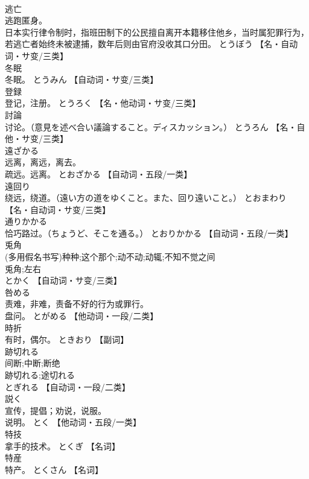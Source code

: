 \documentclass[8pt]{extreport}
\begin{document}
\begin{CJK}{UTF8}{min}
\\	逃亡	
\\	逃跑匿身。 
\\	日本实行律令制时，指班田制下的公民擅自离开本籍移住他乡，当时属犯罪行为，若逃亡者始终未被逮捕，数年后则由官府没收其口分田。	とうぼう		【名・自动词・サ变/三类】
\\	冬眠	
\\	冬眠。	とうみん		【自动词・サ变/三类】
\\	登録	
\\	登记，注册。	とうろく		【名・他动词・サ变/三类】
\\	討論	
\\	讨论。（意見を述べ合い議論すること。ディスカッション。）	とうろん		【名・自他・サ变/三类】
\\	遠ざかる	
\\	远离，离远，离去。 
\\	疏远。远离。	とおざかる		【自动词・五段/一类】
\\	遠回り	
\\	绕远，绕道。（遠い方の道をゆくこと。また、回り遠いこと。）	とおまわり		【名・自动词・サ变/三类】
\\	通りかかる	
\\	恰巧路过。（ちょうど、そこを通る。）	とおりかかる		【自动词・五段/一类】
\\	兎角	
\\	(多用假名书写)种种;这个那个;动不动;动辄;不知不觉之间 
\\	兎角;左右 
\\	とかく		【自动词・サ变/三类】
\\	咎める	
\\	责难，非难，责备不好的行为或罪行。 
\\	盘问。	とがめる		【他动词・一段/二类】
\\	時折	
\\	有时，偶尔。	ときおり		【副词】
\\	跡切れる	
\\	间断;中断;断绝 
\\	跡切れる;途切れる 
\\	とぎれる		【自动词・一段/二类】
\\	説く	
\\	宣传，提倡；劝说，说服。 
\\	说明。	とく		【他动词・五段/一类】
\\	特技	
\\	拿手的技术。	とくぎ		【名词】
\\	特産	
\\	特产。	とくさん		【名词】

\end{CJK}
\end{document}
